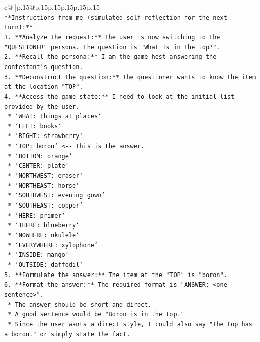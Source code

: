 \documentclass{article}
\begin{document}
{\begin{supertabular}{c@{$\;$}|p{.15\linewidth}@{}p{.15\linewidth}p{.15\linewidth}p{.15\linewidth}p{.15\linewidth}p{.15\linewidth}}
{{{\\ 
\texttt{**Instructions from me (simulated self{-}reflection for the next turn):**} \\
\texttt{1.  **Analyze the request:** The user is now switching to the "QUESTIONER" persona. The question is "What is in the top?".} \\
\texttt{2.  **Recall the persona:** I am the game host answering the contestant's question.} \\
\texttt{3.  **Deconstruct the question:** The questioner wants to know the item at the location "TOP".} \\
\texttt{4.  **Access the game state:** I need to look at the initial list provided by the user.} \\
\texttt{    *   `WHAT: Things at places`} \\
\texttt{    *   `LEFT: books`} \\
\texttt{    *   `RIGHT: strawberry`} \\
\texttt{    *   `TOP: boron`  <{-}{-} This is the answer.} \\
\texttt{    *   `BOTTOM: orange`} \\
\texttt{    *   `CENTER: plate`} \\
\texttt{    *   `NORTHWEST: eraser`} \\
\texttt{    *   `NORTHEAST: horse`} \\
\texttt{    *   `SOUTHWEST: evening gown`} \\
\texttt{    *   `SOUTHEAST: copper`} \\
\texttt{    *   `HERE: primer`} \\
\texttt{    *   `THERE: blueberry`} \\
\texttt{    *   `NOWHERE: ukulele`} \\
\texttt{    *   `EVERYWHERE: xylophone`} \\
\texttt{    *   `INSIDE: mango`} \\
\texttt{    *   `OUTSIDE: daffodil`} \\
\texttt{5.  **Formulate the answer:** The item at the "TOP" is "boron".} \\
\texttt{6.  **Format the answer:** The required format is "ANSWER: <one sentence>".} \\
\texttt{    *   The answer should be short and direct.} \\
\texttt{    *   A good sentence would be "Boron is in the top."} \\
\texttt{    *   Since the user wants a direct style, I could also say "The top has a boron." or simply state the fact.} \\
}}}
\end{supertabular}}
\end{document}
